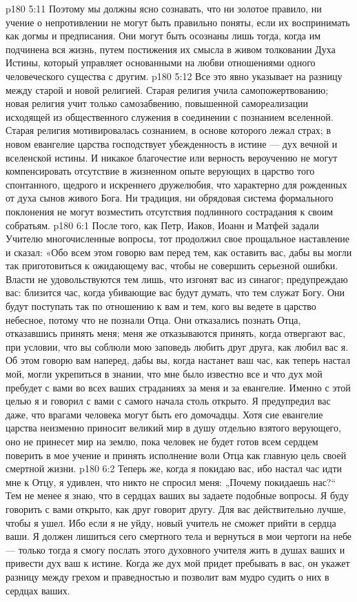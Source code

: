 \vs p180 5:11 Поэтому мы должны ясно сознавать, что ни золотое правило, ни учение о непротивлении не могут быть правильно поняты, если их воспринимать как догмы и предписания. Они могут быть осознаны лишь тогда, когда им подчинена вся жизнь, путем постижения их смысла в живом толковании Духа Истины, который управляет основанными на любви отношениями одного человеческого существа с другим.
\vs p180 5:12 Все это явно указывает на разницу между старой и новой религией. Старая религия учила самопожертвованию; новая религия учит только самозабвению, повышенной самореализации исходящей из общественного служения в соединении с познанием вселенной. Старая религия мотивировалась сознанием, в основе которого лежал страх; в новом евангелие царства господствует убежденность в истине --- дух вечной и вселенской истины. И никакое благочестие или верность вероучению не могут компенсировать отсутствие в жизненном опыте верующих в царство того спонтанного, щедрого и искреннего дружелюбия, что характерно для рожденных от духа сынов живого Бога. Ни традиция, ни обрядовая система формального поклонения не могут возместить отсутствия подлинного сострадания к своим собратьям.
\vs p180 6:1 После того, как Петр, Иаков, Иоанн и Матфей задали Учителю многочисленные вопросы, тот продолжил свое прощальное наставление и сказал: «Обо всем этом говорю вам перед тем, как оставить вас, дабы вы могли так приготовиться к ожидающему вас, чтобы не совершить серьезной ошибки. Власти не удовольствуются тем лишь, что изгонят вас из синагог; предупреждаю вас: близится час, когда убивающие вас будут думать, что тем служат Богу. Они будут поступать так по отношению к вам и тем, кого вы ведете в царство небесное, потому что не познали Отца. Они отказались познать Отца, отказавшись принять меня; меня же отказываются принять, когда отвергают вас, при условии, что вы соблюли мою заповедь любить друг друга, как любил вас я. Об этом говорю вам наперед, дабы вы, когда настанет ваш час, как теперь настал мой, могли укрепиться в знании, что мне было известно все и что дух мой пребудет с вами во всех ваших страданиях за меня и за евангелие. Именно с этой целью я и говорил с вами с самого начала столь открыто. Я предупредил вас даже, что врагами человека могут быть его домочадцы. Хотя сие евангелие царства неизменно приносит великий мир в душу отдельно взятого верующего, оно не принесет мир на землю, пока человек не будет готов всем сердцем поверить в мое учение и принять исполнение воли Отца как главную цель своей смертной жизни.
\vs p180 6:2 Теперь же, когда я покидаю вас, ибо настал час идти мне к Отцу, я удивлен, что никто не спросил меня: „Почему покидаешь нас?“ Тем не менее я знаю, что в сердцах ваших вы задаете подобные вопросы. Я буду говорить с вами открыто, как друг говорит другу. Для вас действительно лучше, чтобы я ушел. Ибо если я не уйду, новый учитель не сможет прийти в сердца ваши. Я должен лишиться сего смертного тела и вернуться в мои чертоги на небе --- только тогда я смогу послать этого духовного учителя жить в душах ваших и привести дух ваш к истине. Когда же дух мой придет пребывать в вас, он укажет разницу между грехом и праведностью и позволит вам мудро судить о них в сердцах ваших.

